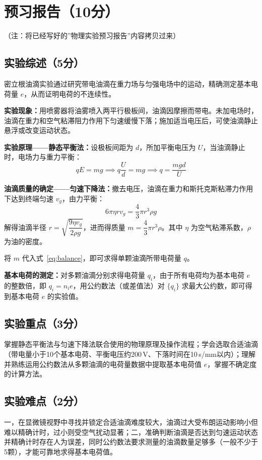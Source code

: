 \documentclass{Phyport}
\begin{document}
\setcounter{page}{1}
\makecover

\section{预习报告（10分）}
（注：将已经写好的”物理实验预习报告”内容拷贝过来）

\subsection{实验综述（5分）}
密立根油滴实验通过研究带电油滴在重力场与匀强电场中的运动，精确测定基本电荷量 $e$，从而证明电荷的不连续性。

\textbf{实验现象：}用喷雾器将油雾喷入两平行极板间，油滴因摩擦而带电。未加电场时，油滴在重力和空气粘滞阻力作用下匀速缓慢下落；施加适当电压后，可使油滴静止悬浮或改变运动状态。

\textbf{实验原理——静态平衡法：}设极板间距为 $d$，所加平衡电压为 $U$，当油滴静止时，电场力与重力平衡：
\begin{equation}
    qE = mg \implies q\frac{U}{d} = mg \implies q = \frac{mgd}{U}
    \label{eq:balance}
\end{equation}

\textbf{油滴质量的确定——匀速下降法：}撤去电压，油滴在重力和斯托克斯粘滞力作用下达到终端匀速 $v_g$，由力平衡：
\begin{equation}
    6\pi\eta r v_g = \frac{4}{3}\pi r^3 \rho g
    \label{eq:stokes}
\end{equation}
解得油滴半径 $r = \sqrt{\dfrac{9\eta v_g}{2\rho g}}$，进而得质量 $m = \dfrac{4}{3}\pi r^3 \rho$。其中 $\eta$ 为空气粘滞系数，$\rho$ 为油的密度。

将 $m$ 代入式~\eqref{eq:balance}，即可求得单颗油滴所带电荷量 $q$。

\textbf{基本电荷的测定：}对多颗油滴分别求得电荷量 $q_i$，由于所有电荷均为基本电荷 $e$ 的整数倍，即 $q_i = n_i e$，用公约数法（或差值法）对 $\{q_i\}$ 求最大公约数，即可得到基本电荷 $e$ 的实验值。

\subsection{实验重点（3分）}
掌握静态平衡法与匀速下降法联合使用的物理原理及操作流程；学会选取合适油滴（带电量小于10个基本电荷、平衡电压约200\,V、下落时间在10\,s/mm以内）；理解并熟练运用公约数法从多颗油滴的电荷量数据中提取基本电荷值 $e$，掌握不确定度的计算方法。

\subsection{实验难点（2分）}
一，在显微镜视野中寻找并锁定合适油滴难度较大，油滴过大受布朗运动影响小但难以精确计时，过小则受空气扰动显著；二，准确判断油滴是否达到匀速运动状态并精确计时存在人为误差，同时公约数法要求测量的油滴数量足够多（一般不少于5颗），才能可靠地求得基本电荷值。
\end{document}
